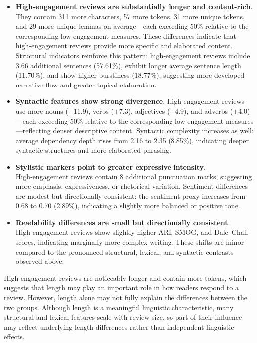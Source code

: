 \begin{itemize}  

\item \textbf{High‑engagement reviews are substantially longer and content-rich}.  
They contain 311 more characters, 57 more tokens, 31 more unique tokens, and 29 more unique lemmas on average—each exceeding 50\% relative to the corresponding low‑engagement measures. These differences indicate that high‑engagement reviews provide more specific and elaborated content. Structural indicators reinforce this pattern: high‑engagement reviews include 3.66 additional sentences (57.61\%), exhibit longer average sentence length (11.70\%), and show higher burstiness (18.77\%), suggesting more developed narrative flow and greater topical elaboration.

\item \textbf{Syntactic features show strong divergence}.  
High‑engagement reviews use more nouns (+11.9), verbs (+7.3), adjectives (+4.9), and adverbs (+4.0)—each exceeding 50\% relative to the corresponding low‑engagement measures—reflecting denser descriptive content. Syntactic complexity increases as well: average dependency depth rises from 2.16 to 2.35 (8.85\%), indicating deeper syntactic structures and more elaborated phrasing.

\item \textbf{Stylistic markers point to greater expressive intensity}.  
High‑engagement reviews contain 8 additional punctuation marks, suggesting more emphasis, expressiveness, or rhetorical variation. Sentiment differences are modest but directionally consistent: the sentiment proxy increases from 0.68 to 0.70 (2.89\%), indicating a slightly more balanced or positive tone.

\item \textbf{Readability differences are small but directionally consistent}.  
High‑engagement reviews show slightly higher ARI, SMOG, and Dale–Chall scores, indicating marginally more complex writing. These shifts are minor compared to the pronounced structural, lexical, and syntactic contrasts observed above.

\end{itemize}

High‑engagement reviews are noticeably longer and contain more tokens,
which suggests that length may play an important role in how readers
respond to a review. However, length alone may not fully explain the
differences between the two groups. Although length is a meaningful
linguistic characteristic, many structural and lexical features scale
with review size, so part of their influence may reflect underlying
length differences rather than independent linguistic effects.

